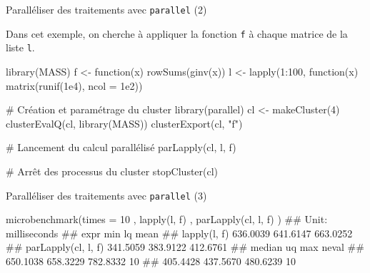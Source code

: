 \documentclass[12pt,handout,ignorenonframetext,]{beamer}
\newenvironment{Shaded}{}{}
\newcommand{\KeywordTok}[1]{\textcolor[rgb]{0.00,0.00,1.00}{#1}}
\newcommand{\DataTypeTok}[1]{#1}
\newcommand{\DecValTok}[1]{#1}
\newcommand{\FloatTok}[1]{#1}
\newcommand{\StringTok}[1]{\textcolor[rgb]{0.00,0.50,0.50}{#1}}
\newcommand{\CommentTok}[1]{\textcolor[rgb]{0.00,0.50,0.00}{#1}}
\newcommand{\ControlFlowTok}[1]{\textcolor[rgb]{0.00,0.00,1.00}{#1}}
\newcommand{\OperatorTok}[1]{#1}
\newcommand{\NormalTok}[1]{#1}
\renewenvironment{Shaded}{\begin{snugshade}}{\end{snugshade}}
\begin{document}
\begin{frame}[fragile]{\large Paralléliser des traitements avec
\texttt{parallel} (2)}

Dans cet exemple, on cherche à appliquer la fonction \texttt{f} à chaque
matrice de la liste \texttt{l}.

\footnotesize

\begin{Shaded}
\begin{Highlighting}[]
\KeywordTok{library}\NormalTok{(MASS)}
\NormalTok{f <-}\StringTok{ }\ControlFlowTok{function}\NormalTok{(x) }\KeywordTok{rowSums}\NormalTok{(}\KeywordTok{ginv}\NormalTok{(x))}
\NormalTok{l <-}\StringTok{ }\KeywordTok{lapply}\NormalTok{(}\DecValTok{1}\OperatorTok{:}\DecValTok{100}\NormalTok{, }\ControlFlowTok{function}\NormalTok{(x) }\KeywordTok{matrix}\NormalTok{(}\KeywordTok{runif}\NormalTok{(}\FloatTok{1e4}\NormalTok{), }\DataTypeTok{ncol =} \FloatTok{1e2}\NormalTok{))}

\CommentTok{# Création et paramétrage du cluster}
\KeywordTok{library}\NormalTok{(parallel)}
\NormalTok{cl <-}\StringTok{ }\KeywordTok{makeCluster}\NormalTok{(}\DecValTok{4}\NormalTok{)}
\KeywordTok{clusterEvalQ}\NormalTok{(cl, }\KeywordTok{library}\NormalTok{(MASS))}
\KeywordTok{clusterExport}\NormalTok{(cl, }\StringTok{"f"}\NormalTok{)}

\CommentTok{# Lancement du calcul parallélisé}
\KeywordTok{parLapply}\NormalTok{(cl, l, f)}

\CommentTok{# Arrêt des processus du cluster}
\KeywordTok{stopCluster}\NormalTok{(cl)}
\end{Highlighting}
\end{Shaded}

\end{frame}

\begin{frame}[fragile]{\large Paralléliser des traitements avec
\texttt{parallel} (3)}

\begin{Shaded}
\begin{Highlighting}[]
\KeywordTok{microbenchmark}\NormalTok{(}\DataTypeTok{times =} \DecValTok{10}
\NormalTok{  , }\KeywordTok{lapply}\NormalTok{(l, f)}
\NormalTok{  , }\KeywordTok{parLapply}\NormalTok{(cl, l, f)}
\NormalTok{)}
\NormalTok{  ## Unit: milliseconds}
\NormalTok{  ##                 expr      min       lq     mean}
\NormalTok{  ##         lapply(l, f) 636.0039 641.6147 663.0252}
\NormalTok{  ##  parLapply(cl, l, f) 341.5059 383.9122 412.6761}
\NormalTok{  ##    median       uq      max neval}
\NormalTok{  ##  650.1038 658.3229 782.8332    10}
\NormalTok{  ##  405.4428 437.5670 480.6239    10}
\end{Highlighting}
\end{Shaded}

\end{frame}
\end{document}
